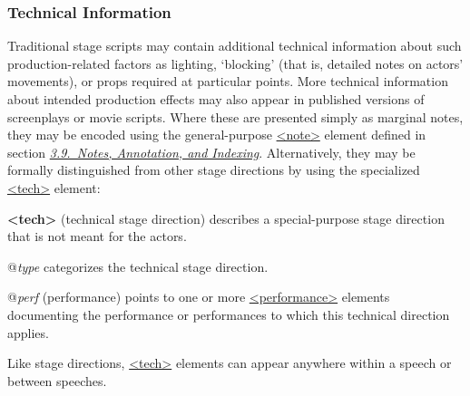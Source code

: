 \subsubsection[{Technical Information}]{Technical Information}\label{DRTEC}\par
Traditional stage scripts may contain additional technical information about such production-related factors as lighting, ‘blocking’ (that is, detailed notes on actors' movements), or props required at particular points. More technical information about intended production effects may also appear in published versions of screenplays or movie scripts. Where these are presented simply as marginal notes, they may be encoded using the general-purpose \hyperref[TEI.note]{<note>} element defined in section \textit{\hyperref[CONO]{3.9.\ Notes, Annotation, and Indexing}}. Alternatively, they may be formally distinguished from other stage directions by using the specialized \hyperref[TEI.tech]{<tech>} element: 
\begin{sansreflist}
  
\item [\textbf{<tech>}] (technical stage direction) describes a special-purpose stage direction that is not meant for the actors.\hfil\\[-10pt]\begin{sansreflist}
    \item[@{\itshape type}]
  categorizes the technical stage direction.
    \item[@{\itshape perf}]
  (performance) points to one or more \hyperref[TEI.performance]{<performance>} elements documenting the performance or performances to which this technical direction applies.
\end{sansreflist}  
\end{sansreflist}
\par
Like stage directions, \hyperref[TEI.tech]{<tech>} elements can appear anywhere within a speech or between speeches.
